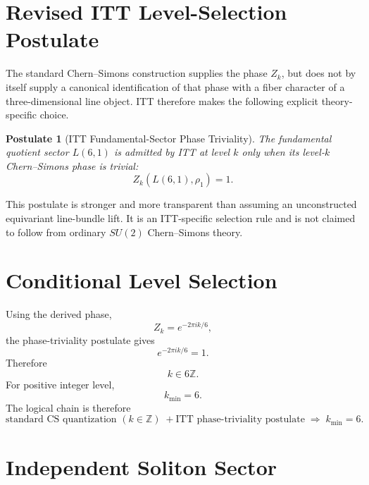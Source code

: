 \documentclass[11pt,a4paper]{article}
\newtheorem{postulate}[definition]{Postulate}
\begin{document}
\section{Revised ITT Level-Selection Postulate}

The standard Chern--Simons construction supplies the phase $Z_k$, but does not by itself supply a canonical identification of that phase with a fiber character of a three-dimensional line object. ITT therefore makes the following explicit theory-specific choice.

\begin{postulate}[ITT Fundamental-Sector Phase Triviality]
The fundamental quotient sector $L(6,1)$ is admitted by ITT at level $k$ only when its level-$k$ Chern--Simons phase is trivial:
\begin{equation}
\boxed{
Z_k(L(6,1),\rho_1)=1.
}
\end{equation}
\end{postulate}

This postulate is stronger and more transparent than assuming an unconstructed equivariant line-bundle lift. It is an ITT-specific selection rule and is not claimed to follow from ordinary $SU(2)$ Chern--Simons theory.

\section{Conditional Level Selection}

Using the derived phase,
\begin{equation}
Z_k=e^{-2\pi i k/6},
\end{equation}
the phase-triviality postulate gives
\begin{equation}
e^{-2\pi i k/6}=1.
\end{equation}
Therefore
\begin{equation}
\boxed{k\in6\mathbb Z.}
\end{equation}
For positive integer level,
\begin{equation}
\boxed{k_{\min}=6.}
\end{equation}
The logical chain is therefore
\begin{equation}
\text{standard CS quantization }(k\in\mathbb Z)
\;+
\text{ITT phase-triviality postulate}
\;\Longrightarrow\;
k_{\min}=6.
\end{equation}

\section{Independent Soliton Sector}
\end{document}
